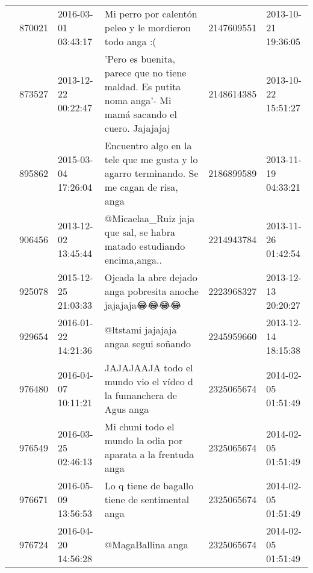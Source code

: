 \begin{tabular}{llllrl}
           & 870021  & 2016-03-01 03:43:17 &                                                                                      Mi perro por calentón peleo y le mordieron todo anga :( &  2147609551 & 2013-10-21 19:36:05 \\
           & 873527  & 2013-12-22 00:22:47 &                                      'Pero es buenita, parece que no tiene maldad. Es putita noma anga'- Mi mamá sacando el cuero. Jajajajaj &  2148614385 & 2013-10-22 15:51:27 \\
           & 895862  & 2015-03-04 17:26:04 &                                                     Encuentro algo en la tele que me gusta y lo agarro terminando. Se me cagan de risa, anga &  2186899589 & 2013-11-19 04:33:21 \\
           & 906456  & 2013-12-02 13:45:44 &                                                                        @Micaelaa\_Ruiz jaja que sal, se habra matado estudiando encima,anga.. &  2214943784 & 2013-11-26 01:42:54 \\
           & 925078  & 2015-12-25 21:03:33 &                                                                                     Ojeada la abre dejado anga pobresita anoche jajajaja😂😂😂😂 &  2223968327 & 2013-12-13 20:20:27 \\
           & 929654  & 2016-01-22 14:21:36 &                                                                                                        @ltstami jajajaja angaa segui soñando &  2245959660 & 2013-12-14 18:15:38 \\
           & 976480  & 2016-04-07 10:11:21 &                                                                            JAJAJAAJA todo el mundo vio el vídeo d la fumanchera de Agus anga &  2325065674 & 2014-02-05 01:51:49 \\
           & 976549  & 2016-03-25 02:46:13 &                                                                                Mi chuni todo el mundo la odia por aparata a la frentuda anga &  2325065674 & 2014-02-05 01:51:49 \\
           & 976671  & 2016-05-09 13:56:53 &                                                                                              Lo q tiene de bagallo tiene de sentimental anga &  2325065674 & 2014-02-05 01:51:49 \\
           & 976724  & 2016-04-20 14:56:28 &                                                                                                                            @MagaBallina anga &  2325065674 & 2014-02-05 01:51:49 \\

\end{tabular}
